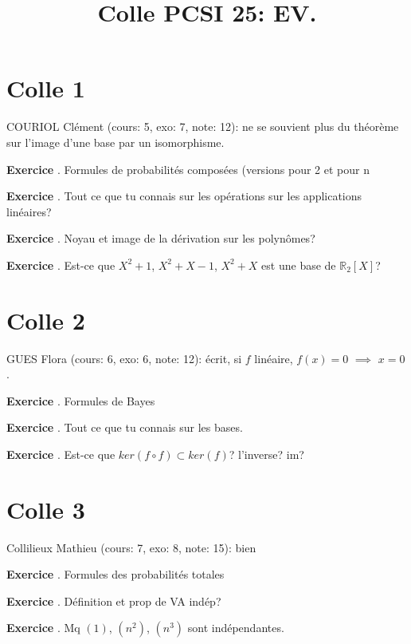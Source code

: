 \documentclass[10pt,a4paper]{article}
\title{Colle PCSI 25: EV.}
\newcounter{question}
\newcounter{exo}
\newenvironment{exo}{\vspace{0.5cm}\setcounter{question}{0}\addtocounter{exo}{1} \noindent \textbf{Exercice \theexo}. \normalsize }{\par}
\begin{document}
	\maketitle
	
	
	\section*{Colle 1}
	\setcounter{exo}{0}
	COURIOL Clément (cours: 5, exo: 7, note: 12): ne se souvient plus du théorème sur l'image d'une base par un isomorphisme. \\
	
	\begin{exo}
		 Formules de probabilités composées (versions pour 2 et pour n
	\end{exo}

	\begin{exo}
		Tout ce que tu connais sur les opérations sur les applications linéaires?
	\end{exo}

	\begin{exo}
		Noyau et image de la dérivation sur les polynômes?
	\end{exo}	

	\begin{exo}
		Est-ce que $X^2 + 1$, $X^2+ X - 1$, $X^2 + X$ est une base de $\mathbb{R}_2[X]$?
	\end{exo}	
	
	\section*{Colle 2}
	\setcounter{exo}{0}
	GUES Flora (cours: 6, exo: 6, note: 12): écrit, si $f$ linéaire, $f(x) = 0$ $\implies$ $x = 0$.
	
	\begin{exo}
		 Formules de Bayes
	\end{exo}		

	\begin{exo}
		Tout ce que tu connais sur les bases.
	\end{exo}

	\begin{exo}
		Est-ce que $ker(f \circ f) \subset ker(f)$? l'inverse? im?
	\end{exo}	

	\section*{Colle 3}
	\setcounter{exo}{0}
	Collilieux Mathieu (cours: 7, exo: 8, note: 15): bien\\
	
	
	\begin{exo}
		 Formules des probabilités totales
	\end{exo}		
	
	\begin{exo}
		Définition et prop de VA indép?
	\end{exo}

	\begin{exo}
		Mq $(1)$, $(n^2)$, $(n^3)$ sont indépendantes.
	\end{exo}
\end{document}
